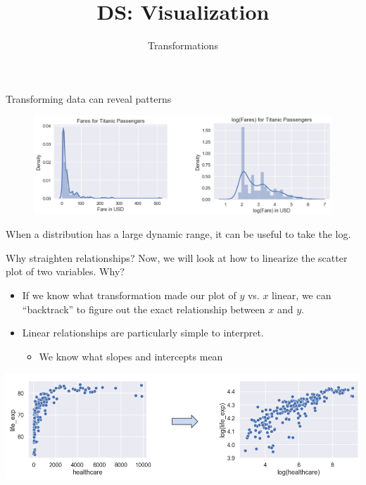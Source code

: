 \documentclass[aspectratio=169]{../latex_main/tntbeamer}  %
\title[Visualization]{DS: Visualization}
\subtitle{Transformations}
\begin{document}
	
	\maketitle
	\begin{frame}{Transforming data can reveal patterns}
	    \begin{figure}
	        \centering
	        \includegraphics[scale=.43]{Bild94}
	    \end{figure}
	    When a distribution has a large dynamic range, it can be useful to take the log.
	\end{frame}
	
	
	\begin{frame}{Why straighten relationships?}
	   Now, we will look at how to linearize the scatter plot of two variables. Why?
	   \begin{itemize}
	       \item If we know what transformation made our plot of $y$ vs. $x$ linear, we can “backtrack” to figure out the exact relationship between $x$ and $y$.
	       \item Linear relationships are particularly simple to interpret.
	       \begin{itemize}
	           \item We know what slopes and intercepts mean
	       \end{itemize}
	   \end{itemize}
	        \includegraphics[scale=.43]{Bild95}
	\end{frame}
	
	
	
\end{document}
